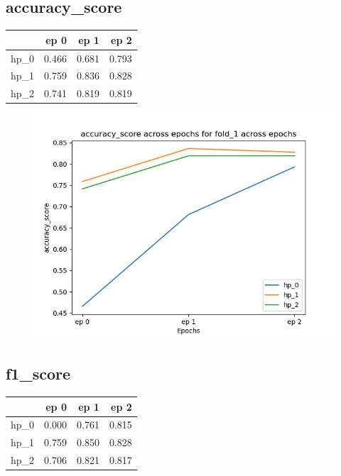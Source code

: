 \documentclass{article}
\begin{document}
\subsection{accuracy\_score}
\begin{tabular}{lrrr}
\toprule
{} &   ep 0 &   ep 1 &   ep 2 \\
\midrule
hp\_0 &  0.466 &  0.681 &  0.793 \\
hp\_1 &  0.759 &  0.836 &  0.828 \\
hp\_2 &  0.741 &  0.819 &  0.819 \\
\bottomrule
\end{tabular}

\begin{figure}[H]
\includegraphics[scale = 0.75]{fold_1/accuracy_score}
\end{figure}
\subsection{f1\_score}
\begin{tabular}{lrrr}
\toprule
{} &   ep 0 &   ep 1 &   ep 2 \\
\midrule
hp\_0 &  0.000 &  0.761 &  0.815 \\
hp\_1 &  0.759 &  0.850 &  0.828 \\
hp\_2 &  0.706 &  0.821 &  0.817 \\
\bottomrule
\end{tabular}
\end{document}

